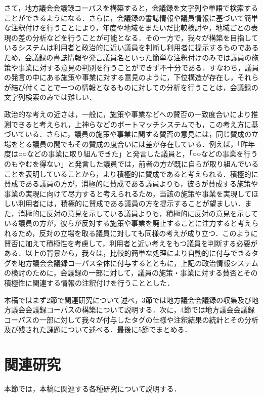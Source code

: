 \documentclass[japanese]{jnlp_1.4}
\begin{document}
さて，地方議会会議録コーパスを構築すると，会議録を文字列や単語で検索することができるようになる．さらに，会議録の書誌情報や議員情報に基づいて簡単な注釈付けを行うことにより，年度や地域をまたいだ比較検討や，地域ごとの表現の差の分析などを行うことが可能となる．その一方で，我々が構築を目指しているシステムは利用者と政治的に近い議員を判断し利用者に提示するものであるため，会議録の書誌情報や発言議員名といった簡単な注釈付けのみでは議員の施策や事業に対する意見の判別を行うことができず不十分である．すなわち，議員の発言の中にある施策や事業に対する意見のように，下位構造が存在し，それらが結び付くことで一つの情報となるものに対しての分析を行うことは，会議録の文字列検索のみでは難しい．

政治的な考えの近さは，一般に，施策や事業などへの賛否の一致度合いにより推測できると考えられ，上神ら\cite{uekm,uekm2,kgm}などのボートマッチシステムでも，この考え方に基づいている．さらに，議員の施策や事業に関する賛否の意見には，同じ賛成の立場をとる議員の間でもその賛成の度合いには差が存在している．例えば，「昨年度は○○などの事業に取り組んできた」と発言した議員と，「○○などの事業を行うのもやむを得ない」と発言した議員では，前者の方が既に自らが取り組んでいることを表明していることから，より積極的に賛成であると考えられる．積極的に賛成である議員の方が，消極的に賛成である議員よりも，彼らが賛成する施策や事業の実現に向けて尽力すると考えられるため，当該の施策や事業を実現してほしい利用者には，積極的に賛成である議員の方を提示することが望ましい．また，消極的に反対の意見を示している議員よりも，積極的に反対の意見を示している議員の方が，彼らが反対する施策や事業を廃止することに注力すると考えられるため，反対の立場を取る議員に対しても同様の考えが成り立つ．このように賛否に加えて積極性を考慮して，利用者と近い考えをもつ議員を判断する必要がある．以上の背景から，我々は，比較的簡単な処理により自動的に付与できるタグを地方議会会議録コーパス全体に付与するとともに，上記の政治情報システムの検討のために，会議録の一部に対して，議員の施策・事業に対する賛否とその積極性に関連する情報の注釈付けを行うこととした．

本稿ではまず2節で関連研究について述べ，3節では地方議会会議録の収集及び地方議会会議録コーパスの構築について説明する．次に，4節では地方議会会議録コーパスの一部に対して我々が付与したタグの仕様や注釈結果の統計とその分析及び残された課題について述べる．最後に5節でまとめる．


\section{関連研究}

本節では，本稿に関連する各種研究について説明する．
\end{document}
